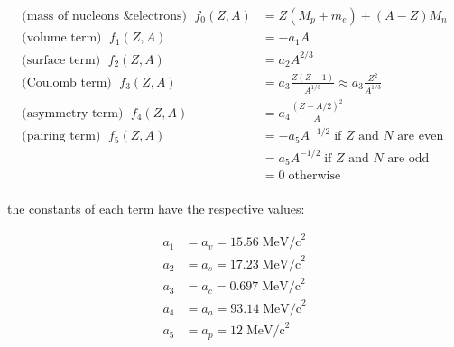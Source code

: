 \documentclass[10pt]{article}
\theoremstyle{definition}
\begin{document}
\begin{align*}
    \text{(mass of nucleons \& electrons) }\; f_0(Z,A) &= Z(M_p + m_e) + (A-Z)M_n\\
    \text{(volume term) }\; f_1(Z,A) &= -a_1 A\\
    \text{(surface term) }\; f_2(Z,A) &= a_2 A^{2/3}\\
    \text{(Coulomb term) }\; f_3(Z,A) &= a_3 \frac{Z(Z-1)}{A^{1/3}} \approx a_3 \frac{Z^2}{A^{1/3}}\\
    \text{(asymmetry term) }\; f_4(Z,A) &= a_4 \frac{(Z-A/2)^2}{A}\\
    \text{(pairing term) }\; f_5(Z,A) &= -a_5 A^{-1/2}\; \text{if $Z$ and $N$ are even}\\
    &= a_5 A^{-1/2}\; \text{if $Z$ and $N$ are odd}\\
    &= 0 \; \text{otherwise}\\
\end{align*}

the constants of each term have the respective values:

\begin{align*}
    a_1 &= a_v = 15.56 \; \text{MeV/c}^2\\
    a_2 &= a_s = 17.23 \; \text{MeV/c}^2\\
    a_3 &= a_c = 0.697 \; \text{MeV/c}^2\\
    a_4 &= a_a = 93.14 \; \text{MeV/c}^2\\
    a_5 &= a_p = 12 \; \text{MeV/c}^2\\
\end{align*}

\end{document}
